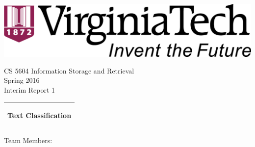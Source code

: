 %
%
%
%
%
\begin{titlepage}
  \addtolength{\hoffset}{0.5\evensidemargin-0.5\oddsidemargin} %
  \noindent%
  \begin{center}
    \includegraphics[width=0.5\textwidth-\tabcolsep]{figures/vt-logo} \\
  \end{center}
  \vspace{0.5cm}
  \begin{center}
    {\Large
      CS 5604 Information Storage and Retrieval \\
      Spring 2016\\
    }
    \vspace{0.2cm}
    {\large
      Interim Report 1%
    }
  \end{center}
  \vspace{0.2cm}
  \begin{tabular}{@{}p{\textwidth}@{}}
    \toprule[2pt]
    \midrule
    \vspace{0.2cm}
    \begin{center}
    \Huge{\textbf{
      Text Classification%
    }}
    \end{center}
    \vspace{0.2cm}\\
    \midrule
    \toprule[2pt]
  \end{tabular}
  \vspace{2 cm}
  \begin{center}
    {\Large
      Team Members:\\
}
\end{center}
\end{titlepage}
